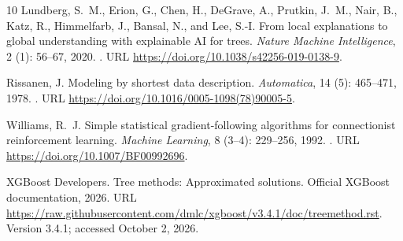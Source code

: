 \begin{thebibliography}{10}
Lundberg, S.~M., Erion, G., Chen, H., DeGrave, A., Prutkin, J.~M., Nair, B.,
  Katz, R., Himmelfarb, J., Bansal, N., and Lee, S.-I.
\newblock From local explanations to global understanding with explainable {AI}
  for trees.
\newblock \emph{Nature Machine Intelligence}, 2 (1): 56--67,
  2020.
\newblock {}.
\newblock URL \url{https://doi.org/10.1038/s42256-019-0138-9}.

Rissanen, J.
\newblock Modeling by shortest data description.
\newblock \emph{Automatica}, 14 (5): 465--471, 1978.
\newblock {}.
\newblock URL \url{https://doi.org/10.1016/0005-1098(78)90005-5}.

Williams, R.~J.
\newblock Simple statistical gradient-following algorithms for connectionist
  reinforcement learning.
\newblock \emph{Machine Learning}, 8 (3--4): 229--256, 1992.
\newblock {}.
\newblock URL \url{https://doi.org/10.1007/BF00992696}.

{XGBoost Developers}.
\newblock Tree methods: Approximated solutions.
\newblock Official XGBoost documentation, 2026.
\newblock URL
  \url{https://raw.githubusercontent.com/dmlc/xgboost/v3.4.1/doc/treemethod.rst}.
\newblock Version 3.4.1; accessed October 2, 2026.

\end{thebibliography}

